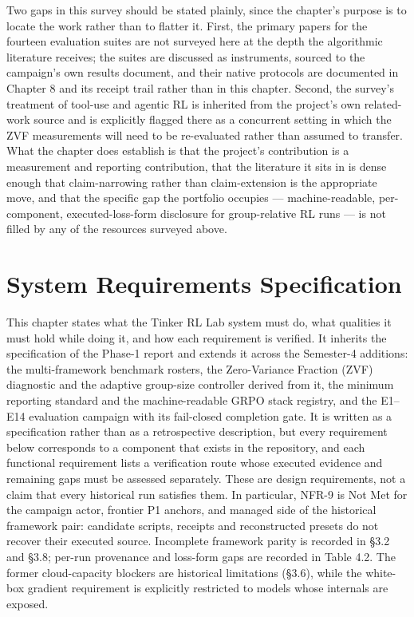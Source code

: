 \documentclass[12pt,a4paper]{report}
\begin{document}
Two gaps in this survey should be stated plainly, since the chapter's
purpose is to locate the work rather than to flatter it. First, the
primary papers for the fourteen evaluation suites are not surveyed here
at the depth the algorithmic literature receives; the suites are
discussed as instruments, sourced to the campaign's own results
document, and their native protocols are documented in Chapter 8 and its
receipt trail rather than in this chapter. Second, the survey's
treatment of tool-use and agentic RL is inherited from the project's own
related-work source and is explicitly flagged there as a concurrent
setting in which the ZVF measurements will need to be re-evaluated
rather than assumed to transfer. What the chapter does establish is that
the project's contribution is a measurement and reporting contribution,
that the literature it sits in is dense enough that claim-narrowing
rather than claim-extension is the appropriate move, and that the
specific gap the portfolio occupies --- machine-readable, per-component,
executed-loss-form disclosure for group-relative RL runs --- is not
filled by any of the resources surveyed above.



\chapter{System Requirements
Specification}\label{system-requirements-specification}

This chapter states what the Tinker RL Lab system must do, what
qualities it must hold while doing it, and how each requirement is
verified. It inherits the specification of the Phase-1 report and
extends it across the Semester-4 additions: the multi-framework
benchmark rosters, the Zero-Variance Fraction (ZVF) diagnostic and the
adaptive group-size controller derived from it, the minimum reporting
standard and the machine-readable GRPO stack registry, and the E1--E14
evaluation campaign with its fail-closed completion gate. It is written
as a specification rather than as a retrospective description, but every
requirement below corresponds to a component that exists in the
repository, and each functional requirement lists a verification route
whose executed evidence and remaining gaps must be assessed separately.
These are design requirements, not a claim that every historical run
satisfies them. In particular, NFR-9 is Not Met for the campaign actor,
frontier P1 anchors, and managed side of the historical framework pair:
candidate scripts, receipts and reconstructed presets do not recover
their executed source. Incomplete framework parity is recorded in §3.2
and §3.8; per-run provenance and loss-form gaps are recorded in Table
4.2. The former cloud-capacity blockers are historical limitations
(§3.6), while the white-box gradient requirement is explicitly
restricted to models whose internals are exposed.
\end{document}
